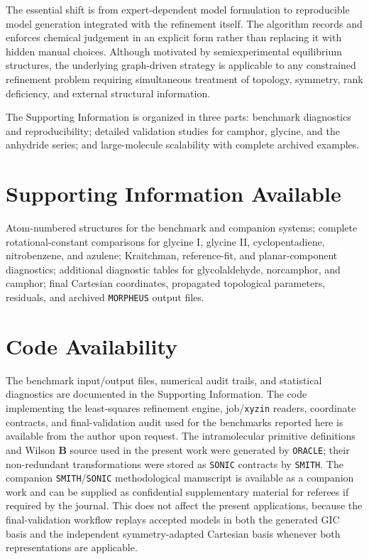 \documentclass[aip,jcp,reprint,longbibliography,floatfix]{revtex4-2}
\begin{document}
The essential shift is from expert-dependent model formulation to reproducible
model generation integrated with the refinement itself. The
algorithm records and enforces chemical judgement in an explicit form rather
than replacing it with hidden manual choices. Although motivated by
semiexperimental equilibrium structures, the underlying graph-driven strategy
is applicable to any constrained refinement problem requiring simultaneous
treatment of topology, symmetry, rank deficiency, and external structural
information.

The Supporting Information is organized in three parts: benchmark diagnostics
and reproducibility; detailed validation studies for camphor, glycine, and the
anhydride series; and large-molecule scalability with complete archived
examples.

\section*{Supporting Information Available}

Atom-numbered structures for the benchmark and companion systems; complete
rotational-constant comparisons for glycine I, glycine II, cyclopentadiene,
nitrobenzene, and azulene; Kraitchman, reference-fit, and planar-component
diagnostics; additional diagnostic tables for glycolaldehyde, norcamphor, and
camphor; final Cartesian coordinates, propagated topological parameters,
residuals, and archived \texttt{MORPHEUS} output files.

\section*{Code Availability}

The benchmark input/output files, numerical audit trails, and statistical
diagnostics are documented in the Supporting Information. The code implementing
the least-squares refinement engine, job/\texttt{xyzin} readers, coordinate
contracts, and final-validation audit used for the benchmarks reported here is
available from the author upon request. The intramolecular primitive
definitions and Wilson $\mathbf{B}$ source used in the present work were
generated by \texttt{ORACLE}; their non-redundant transformations were stored
as \texttt{SONIC} contracts by \texttt{SMITH}. The companion
\texttt{SMITH}/\texttt{SONIC} methodological manuscript is available as a
companion work and can be supplied as confidential supplementary material for
referees if required by the journal. This does not affect the present
applications, because the final-validation workflow replays accepted models in
both the generated GIC basis and the independent symmetry-adapted Cartesian
basis whenever both representations are applicable.




\end{document}
